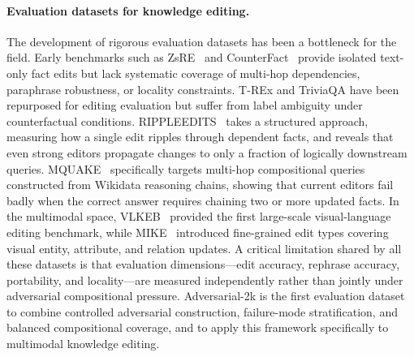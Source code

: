 \documentclass{article}
\begin{document}
\paragraph{Evaluation datasets for knowledge editing.}
The development of rigorous evaluation datasets has been a bottleneck for the field. Early benchmarks such as ZsRE~\cite{editing23} and CounterFact~\cite{rome22} provide isolated text-only fact edits but lack systematic coverage of multi-hop dependencies, paraphrase robustness, or locality constraints. T-REx and TriviaQA have been repurposed for editing evaluation but suffer from label ambiguity under counterfactual conditions. RIPPLEEDITS~\cite{KE_24survey} takes a structured approach, measuring how a single edit ripples through dependent facts, and reveals that even strong editors propagate changes to only a fraction of logically downstream queries. MQUAKE~\cite{easyedit24} specifically targets multi-hop compositional queries constructed from Wikidata reasoning chains, showing that current editors fail badly when the correct answer requires chaining two or more updated facts. In the multimodal space, VLKEB~\cite{vlkeb24} provided the first large-scale visual-language editing benchmark, while MIKE~\cite{mike24} introduced fine-grained edit types covering visual entity, attribute, and relation updates. A critical limitation shared by all these datasets is that evaluation dimensions---edit accuracy, rephrase accuracy, portability, and locality---are measured independently rather than jointly under adversarial compositional pressure. Adversarial-2k is the first evaluation dataset to combine controlled adversarial construction, failure-mode stratification, and balanced compositional coverage, and to apply this framework specifically to multimodal knowledge editing.
\end{document}

